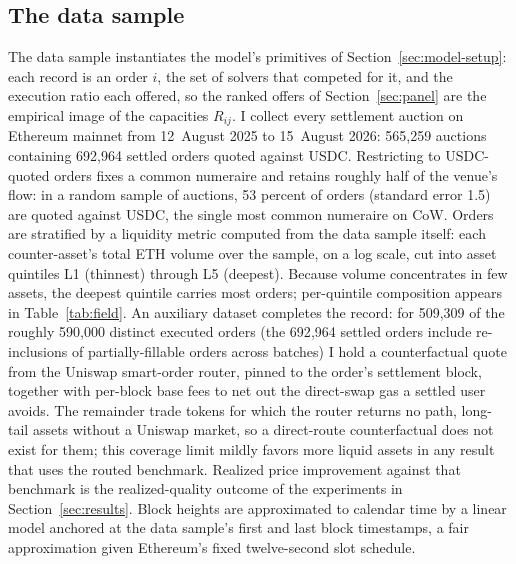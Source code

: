\documentclass[11pt]{article}
\theoremstyle{plain}
\theoremstyle{definition}
\theoremstyle{remark}
\begin{document}
\subsection{The data sample}\label{sec:data}
The data sample instantiates the model's primitives of Section~\ref{sec:model-setup}: each record is an order $i$, the set of solvers that competed for it, and the execution ratio each offered, so the ranked offers of Section~\ref{sec:panel} are the empirical image of the capacities $R_{ij}$. I collect every settlement auction on Ethereum mainnet from 12~August 2025 to 15~August 2026: 565{,}259 auctions containing 692{,}964 settled orders quoted against USDC. Restricting to USDC-quoted orders fixes a common numeraire and retains roughly half of the venue's flow: in a random sample of auctions, 53 percent of orders (standard error 1.5) are quoted against USDC, the single most common numeraire on CoW. Orders are stratified by a liquidity metric computed from the data sample itself: each counter-asset's total ETH volume over the sample, on a log scale, cut into asset quintiles L1 (thinnest) through L5 (deepest). Because volume concentrates in few assets, the deepest quintile carries most orders; per-quintile composition appears in Table~\ref{tab:field}. An auxiliary dataset completes the record: for 509{,}309 of the roughly 590{,}000 distinct executed orders (the 692{,}964 settled orders include re-inclusions of partially-fillable orders across batches) I hold a counterfactual quote from the Uniswap smart-order router, pinned to the order's settlement block, together with per-block base fees to net out the direct-swap gas a settled user avoids. The remainder trade tokens for which the router returns no path, long-tail assets without a Uniswap market, so a direct-route counterfactual does not exist for them; this coverage limit mildly favors more liquid assets in any result that uses the routed benchmark. Realized price improvement against that benchmark is the realized-quality outcome of the experiments in Section~\ref{sec:results}. Block heights are approximated to calendar time by a linear model anchored at the data sample's first and last block timestamps, a fair approximation given Ethereum's fixed twelve-second slot schedule.
\end{document}
